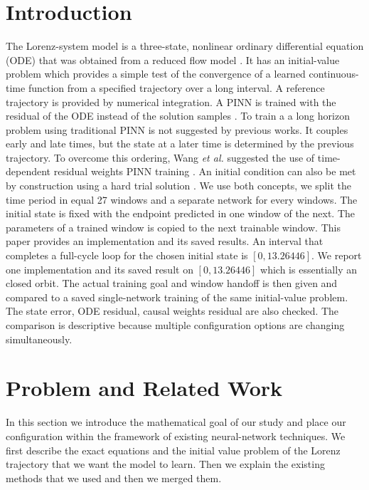 \documentclass[conference]{IEEEtran}
\begin{document}
\section{Introduction}
The Lorenz-system model is a three-state, nonlinear ordinary differential equation (ODE) that was obtained from a reduced flow model \cite{lorenz1960}. It has an initial-value problem which provides a simple test of the convergence of a learned continuous-time function from a specified trajectory over a long interval. A reference trajectory is provided by numerical integration. A PINN is trained with the residual of the ODE instead of the solution samples \cite{raissi2019}. To train a a long horizon problem using traditional PINN is not suggested by previous works\cite{wang2024causal}. It couples early and late times, but the state at a later time is determined by the previous trajectory. To overcome this ordering, Wang \emph{et al.} suggested the use of time-dependent residual weights PINN training \cite{wang2024causal}. An initial condition can also be met by construction using a hard trial solution  \cite{lagaris1998}. We use both concepts, we split the time period in equal 27 windows and a separate network for every windows. The initial state is fixed with the endpoint predicted in one window of the next. The parameters of a trained window is copied to the next trainable window. This paper provides an implementation and its saved results. An interval that completes a full-cycle loop for the chosen initial state is $[0,13.26446]$. We report one implementation and its saved result on $[0, 13.26446]$ which is essentially an closed orbit. The actual training goal and window handoff is then given and compared to a saved single-network training of the same initial-value problem. The state error, ODE residual, causal weights residual are also checked. The comparison is descriptive because multiple configuration options are changing simultaneously.



\section{Problem and Related Work}
In this section we introduce the mathematical goal of our study and place our configuration within the framework of existing neural-network techniques. We first describe the exact equations and the initial value problem of the Lorenz trajectory that we want the model to learn. Then we explain the existing methods that we used and then we merged them.
\end{document}
